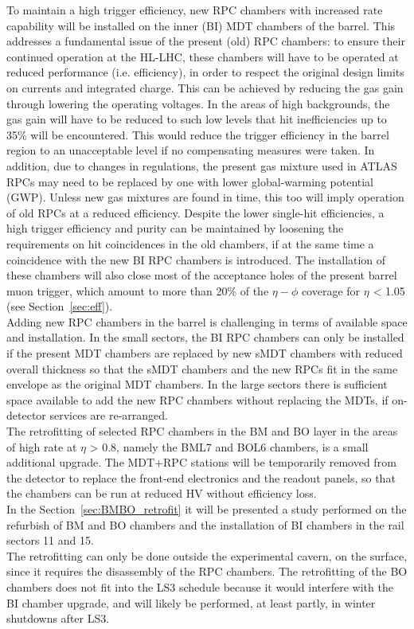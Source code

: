 \noindent To maintain a high trigger efficiency, new RPC chambers with increased rate capability will be installed on the inner (BI) MDT chambers of the barrel. This addresses a fundamental issue
of the present (old) RPC chambers: to ensure their continued operation at the HL-LHC,
these chambers will have to be operated at reduced performance (i.e. efficiency), in order to
respect the original design limits on currents and integrated charge. This can be achieved
by reducing the gas gain through lowering the operating voltages. In the areas of high
backgrounds, the gas gain will have to be reduced to such low levels that hit inefficiencies
up to 35\% will be encountered. This would reduce the trigger efficiency in the barrel region
to an unacceptable level if no compensating measures were taken. In addition, due
to changes in regulations, the present gas mixture used in ATLAS RPCs may need to be
replaced by one with lower global-warming potential (GWP). Unless new gas mixtures are
found in time, this too will imply operation of old RPCs at a reduced efficiency. Despite
the lower single-hit efficiencies, a high trigger efficiency and purity can be maintained by
loosening the requirements on hit coincidences in the old chambers, if at the same time a
coincidence with the new BI RPC chambers is introduced. The installation of these chambers
will also close most of the acceptance holes of the present barrel muon trigger, which
amount to more than 20\% of the $\eta-\phi$ coverage for $\eta$ < 1.05 (see Section~\ref{sec:eff}).\\

\noindent Adding new RPC chambers in the barrel is challenging in terms of available space and
installation. In the small sectors, the BI RPC chambers can only be installed if the present
MDT chambers are replaced by new sMDT chambers with reduced overall thickness so that
the sMDT chambers and the new RPCs fit in the same envelope as the original MDT chambers.
In the large sectors there is sufficient space available to add the new RPC chambers
without replacing the MDTs, if on-detector services are re-arranged.\\
The retrofitting of selected RPC chambers in the BM and BO layer in the areas of high
rate at $\eta$ > 0.8, namely the BML7 and BOL6 chambers, is a small additional upgrade. The
MDT+RPC stations will be temporarily removed from the detector to replace the front-end
electronics and the readout panels, so that the chambers can be run at reduced HV without
efficiency loss. \\
In the Section~\ref{sec:BMBO_retrofit} it will be presented a study performed on the refurbish of
BM and BO chambers and the installation of BI chambers in the rail sectors 11 and 15.\\
The retrofitting can only be done outside the experimental cavern, on the
surface, since it requires the disassembly of the RPC chambers. The retrofitting of the BO
chambers does not fit into the LS3 schedule because it would interfere with the BI chamber
upgrade, and will likely be performed, at least partly, in winter shutdowns after LS3.\\


